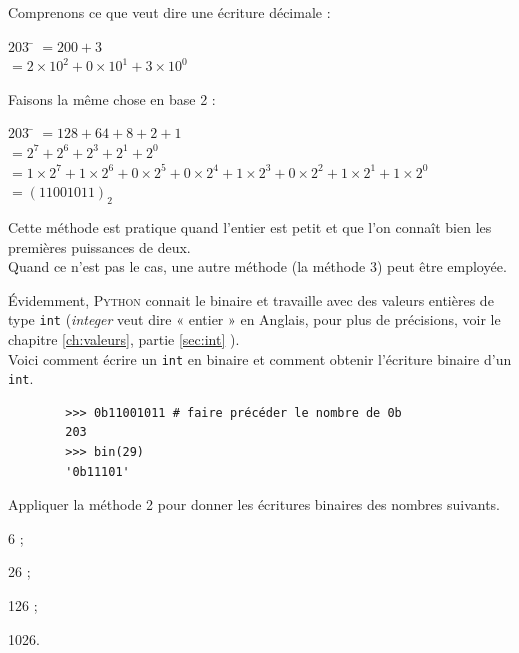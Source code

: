 \begin{methode}
    Comprenons ce que veut dire une écriture décimale :
    \begin{tabbing}
        $203$	\= 	$=200+3$	\\
        
        \>	$=2\times 10^2+0\times 10^1+3\times 10^0$
    \end{tabbing}
    Faisons la même chose en base 2 :
    \begin{tabbing}
        $203$	\= 	$=128+64+8+2+1$	\\
        
        \>	$=2^7+2^6+2^3+2^1+2^0$	\\
        
        \>	$=1\times 2^7+1\times 2^6+0\times 2^5 + 0\times 2^4 +1\times 2^3+0\times 2^2 + 1\times
            2^1+1\times 2^0$	\\
        
        \> $=(11001011)_2$
    \end{tabbing}
    Cette méthode est pratique quand l'entier est petit et que l'on connaît bien les premières puissances de deux.\\
    Quand ce n'est pas le cas, une autre méthode (la méthode 3) peut être employée.
    
\end{methode}
\'Evidemment, \textsc{Python} connait le binaire et travaille avec des valeurs entières de type \texttt{int} (\textit{integer} veut dire « entier » en Anglais, pour plus de précisions, voir le chapitre \ref{ch:valeurs}, partie \ref{sec:int} ).\\
Voici comment écrire un \texttt{int} en binaire et comment obtenir l'écriture
binaire d'un \texttt{int}.
\begin{pyc}
    \begin{verbatim}
        >>> 0b11001011 # faire précéder le nombre de 0b
        203
        >>> bin(29)
        '0b11101'
    \end{verbatim}
\end{pyc}
\begin{exercice}[]
    Appliquer la méthode 2 pour donner les écritures binaires des nombres suivants.
    \begin{enumalph}
        \item 6 ;
        \item 26 ;
        \item 126 ;
        \item 1026.
    \end{enumalph}
\end{exercice}
